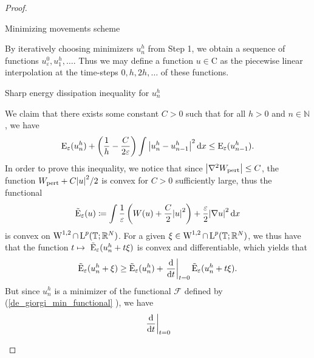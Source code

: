 \begin{proof}
\begin{description}[wide=0pt]
	\item[Step 2:] Minimizing movements scheme 
	
	By iteratively choosing minimizers $ u_{ n }^{ h } $ from Step 1, we obtain a sequence of functions $ u_{ \varepsilon }^{ 0 }, u_{ 1 }^{ h } , \dotsc $. Thus we may define a function $ u \in \mathrm{ C } $ as the piecewise linear interpolation at the time-steps $ 0, h , 2h, \dotsc $ of these functions.
	
	\item[Step 3:] Sharp energy dissipation inequality for $ u_{ n }^{ h } $
	
	We claim that there exists some constant $ C > 0 $ such that for all $ h > 0 $ and $ n \in \mathbb{ N } $, we have
	\begin{equation}
		\label{discrete_optimal_energy_dissipation}
		\operatorname{E}_{ \varepsilon } ( u_{ n }^{ h } )
		+
		\left( \frac{ 1 }{ h } - \frac{ C }{ 2 \varepsilon } \right)
		\int \abs{ u_{ n }^{ h } - u_{ n - 1 }^{ h } }^{ 2 } \dd{ x }
		\leq
		\operatorname{E}_{ \varepsilon } ( u_{ n - 1 }^{ h } ).
	\end{equation}
	In order to prove this inequality, we notice that since $ \abs{ \nabla^{ 2 } W_{ \mathrm{pert} } } \leq C $, the function $ W_{ \mathrm{pert} } + C \abs{ u }^{ 2 }/2 $ is convex for $ C > 0 $ sufficiently large, thus the functional 
	\begin{equation*}
		\tilde{\operatorname{E}}_{ \varepsilon }  ( u )
		\coloneqq
		\int 
			\frac{ 1 }{ \varepsilon }
			\left( W ( u ) + \frac{ C }{ 2 } \abs{ u }^{ 2 } \right)
			+
			\frac{ \varepsilon}{ 2 }
			\abs{ \nabla u }^{ 2 }
		\dd{ x }
	\end{equation*}
	is convex on $ \operatorname{W}^{ 1 , 2 } \cap \operatorname{L}^{ p } ( \operatorname{\mathbb{T}} ; \mathbb{ R }^{ N } ) $. For a given $ \xi \in \operatorname{W}^{ 1 , 2 } \cap \operatorname{L}^{ p } ( \operatorname{\mathbb{T}} ; \mathbb{ R }^{ N } ) $, we thus have that the function
	$ t \mapsto \ \tilde{\operatorname{E}}_{ \varepsilon } ( u_{ n }^{ h } + t \xi ) $ is convex and differentiable, which yields that
	\begin{equation}
		\label{convexity_at_time_1}
		\tilde{\operatorname{E}}_{ \varepsilon } ( u_{ n }^{ h } + \xi )
		\geq
		\tilde{\operatorname{E}}_{ \varepsilon } ( u_{ n }^{ h } ) + 
		\left.\dv{ t }\right|_{ t = 0 } \tilde{\operatorname{E}}_{ \varepsilon } ( u_{ n }^{ h } + t \xi).
	\end{equation} 
	But since $ u_{ n }^{ h } $ is a minimizer of the functional $\mathcal{ F }$ defined by (\ref{de_giorgi_min_functional} ), we have
	\begin{align*}
		\left. \dv{ t } \right|_{ t= 0 }

\end{align*}
\end{description}
\end{proof}
